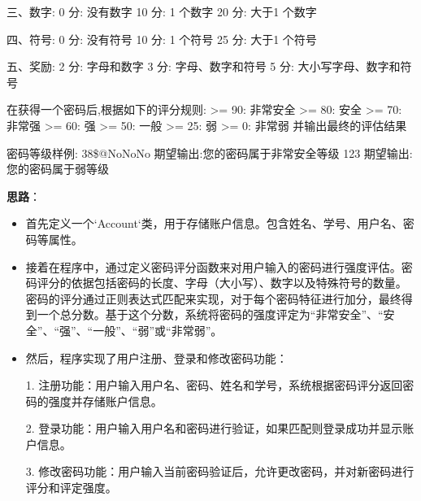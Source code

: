 \documentclass[12pt,a4paper,oneside]{article}
\begin{document}
三、数字:
0 分: 没有数字
10 分: 1 个数字
20 分: 大于1 个数字

四、符号:
0 分: 没有符号
10 分: 1 个符号
25 分: 大于1 个符号

五、奖励:
2 分: 字母和数字
3 分: 字母、数字和符号
5 分: 大小写字母、数字和符号
 
在获得一个密码后,根据如下的评分规则:
>= 90: 非常安全
>= 80: 安全
>= 70: 非常强
>= 60: 强
>= 50: 一般
>= 25: 弱
>= 0:  非常弱
并输出最终的评估结果
 
密码等级样例:
38\$@NoNoNo     期望输出:您的密码属于非常安全等级
123    期望输出:您的密码属于弱等级
 

\textbf{思路}：
\begin{itemize}
    \item 首先定义一个`Account`类，用于存储账户信息。包含姓名、学号、用户名、密码等属性。
    \item 接着在程序中，通过定义密码评分函数来对用户输入的密码进行强度评估。密码评分的依据包括密码的长度、字母（大小写）、数字以及特殊符号的数量。密码的评分通过正则表达式匹配来实现，对于每个密码特征进行加分，最终得到一个总分数。基于这个分数，系统将密码的强度评定为“非常安全”、“安全”、“强”、“一般”、“弱”或“非常弱”。
    \item 然后，程序实现了用户注册、登录和修改密码功能：

	1.	注册功能：用户输入用户名、密码、姓名和学号，系统根据密码评分返回密码的强度并存储账户信息。
	
    2.	登录功能：用户输入用户名和密码进行验证，如果匹配则登录成功并显示账户信息。
	
    3.	修改密码功能：用户输入当前密码验证后，允许更改密码，并对新密码进行评分和评定强度。

\end{itemize}
\end{document}
